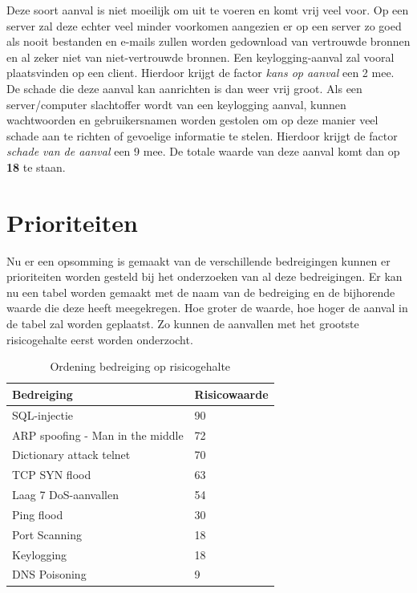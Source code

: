 \documentclass[pdftex,a4paper,12pt]{report}
\begin{document}
Deze soort aanval is niet moeilijk om uit te voeren en komt vrij veel voor. Op een server zal deze echter veel minder voorkomen aangezien er op een server zo goed als nooit bestanden en e-mails zullen worden gedownload van vertrouwde bronnen en al zeker niet van niet-vertrouwde bronnen. Een keylogging-aanval zal vooral plaatsvinden op een client. Hierdoor krijgt de factor \textit{kans op aanval} een 2 mee. De schade die deze aanval kan aanrichten is dan weer vrij groot. Als een server/computer slachtoffer wordt van een keylogging aanval, kunnen wachtwoorden en gebruikersnamen worden gestolen om op deze manier veel schade aan te richten of gevoelige informatie te stelen. Hierdoor krijgt de factor \textit{schade van de aanval} een 9 mee. De totale waarde van deze aanval komt dan op \textbf{18} te staan.

\section{Prioriteiten}
Nu er een opsomming is gemaakt van de verschillende bedreigingen kunnen er prioriteiten worden gesteld bij het onderzoeken van al deze bedreigingen. Er kan nu een tabel worden gemaakt met de naam van de bedreiging en de bijhorende waarde die deze heeft meegekregen. Hoe groter de waarde, hoe hoger de aanval in de tabel zal worden geplaatst. Zo kunnen de aanvallen met het grootste risicogehalte eerst worden onderzocht.

\begin{table}[h]
\centering
\begin{tabular}{|l|l|}
\hline
\textbf{Bedreiging}              & \textbf{Risicowaarde} \\ \hline
SQL-injectie                     & 90                    \\ \hline
ARP spoofing - Man in the middle & 72                    \\ \hline
Dictionary attack telnet         & 70                    \\ \hline
TCP SYN flood                    & 63                    \\ \hline
Laag 7 DoS-aanvallen             & 54                    \\ \hline
Ping flood                       & 30                    \\ \hline
Port Scanning                    & 18                    \\ \hline
Keylogging                       & 18                    \\ \hline
DNS Poisoning                    & 9                     \\ \hline
\end{tabular}
\caption{Ordening bedreiging op risicogehalte}
\label{RisicoTabel}
\end{table}
\end{document}
